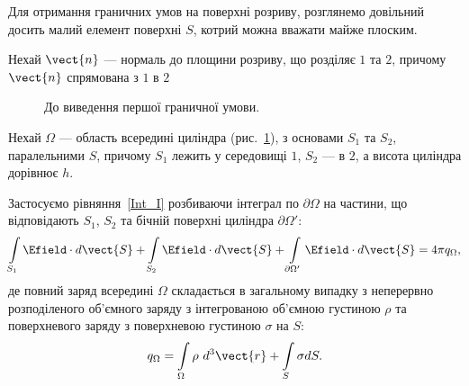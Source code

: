 Для отримання граничних умов на поверхні розриву, розглянемо довільний досить малий елемент поверхні $S$, котрий можна
вважати майже плоским.

Нехай $\vect{n}$ --- нормаль до площини розриву, що розділяє $1$ та $2$, причому $\vect{n}$ спрямована з $1$ в $2$

\begin{figure}
	\centering
	\caption{До виведення першої граничної умови.}%
	\label{tikz:bc1}
\end{figure}

Нехай $\Omega$ --- область всередині циліндра (рис.~\ref{tikz:bc1}), з основами $S_1$ та $S_2$, паралельними $S$,
причому $S_1$ лежить у середовищі $1$, $S_2$ --- в $2$, а висота циліндра дорівнює $h$.

Застосуємо рівняння~\eqref{Int_I} розбиваючи інтеграл по $\partial\Omega$ на частини, що відповідають $S_1$, $S_2$ та
бічній поверхні циліндра $\partial\Omega'$:
\begin{equation*}
	\int\limits_{S_1} \Efield\cdot d\vect{S} +  \int\limits_{S_2} \Efield\cdot d\vect{S} + \int\limits_{\partial\Omega'} \Efield\cdot
	d\vect{S} = 4\pi q_{\Omega},
\end{equation*}
де повний заряд всередині $\Omega$ складається в загальному випадку з неперервно розподіленого об'ємного заряду з
інтегрованою об'ємною густиною $\rho$ та поверхневого заряду з поверхневою густиною $\sigma$ на $S$:
\begin{equation*}
	q_{\Omega} = \int\limits_{\Omega} \rho \ d^3\vect{r} + \int\limits_S \sigma dS.
\end{equation*}


